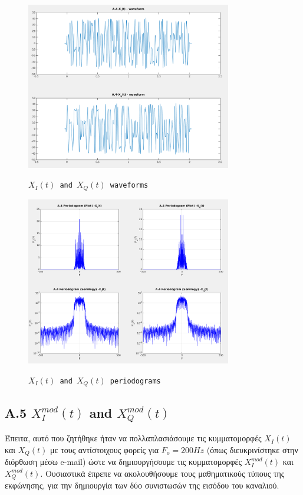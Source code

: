 \documentclass[11pt]{article}
\begin{document}
     \begin{figure}[H]
        \centering
        \includegraphics[scale=0.5, width=0.8\textwidth]{img/A4_wave.png} \\
        \caption{\texttt{$X_I(t)$ and $X_Q(t)$ waveforms}}
    \end{figure}
    
    \begin{figure}[H]
        \centering
        \includegraphics[scale=0.5, width=0.8\textwidth]{img/A4_Period.png} \\
        \caption{\texttt{$X_I(t)$ and $X_Q(t)$ periodograms}}
    \end{figure}
    
    \subsection*{A.5 $X_I^{mod}(t)$ and $X_Q^{mod}(t)$}
    Έπειτα, αυτό που ζητήθηκε ήταν να πολλαπλασιάσουμε τις κυμματομορφές $X_I(t)$ και $X_Q(t)$ με τους αντίστοιχους φορείς για $F_o=200Hz$ (όπως διευκρινίστηκε στην διόρθωση μέσω e-mail) ώστε να δημιουργήσουμε τις κυμματομορφές $X_I^{mod}(t)$ και $X_Q^{mod}(t)$. 
    Ουσιαστικά έπρεπε να ακολουθήσουμε τους μαθηματικούς τύπους της εκφώνησης, για την δημιουργία των δύο συνιστωσών της εισόδου του καναλιού.
    
\end{document}
